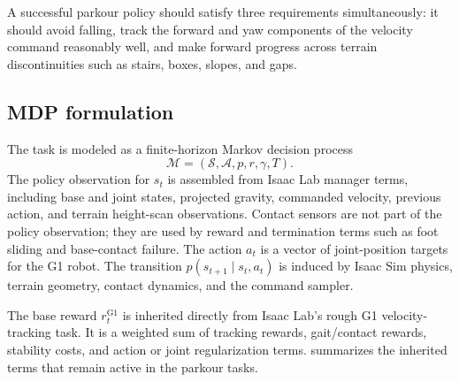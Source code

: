 \documentclass{article}
\begin{document}
A successful parkour policy should satisfy three requirements simultaneously: it should avoid falling, track the forward and yaw components of the velocity command reasonably well, and make forward progress across terrain discontinuities such as stairs, boxes, slopes, and gaps.

\subsection{MDP formulation}

The task is modeled as a finite-horizon Markov decision process
\begin{equation}
    \mathcal{M} = (\mathcal{S}, \mathcal{A}, p, r, \gamma, T).
\end{equation}
The policy observation for $s_t$ is assembled from Isaac Lab manager terms, including base and joint states, projected gravity, commanded velocity, previous action, and terrain height-scan observations. Contact sensors are not part of the policy observation; they are used by reward and termination terms such as foot sliding and base-contact failure. The action $a_t$ is a vector of joint-position targets for the G1 robot. The transition $p(s_{t+1}\mid s_t,a_t)$ is induced by Isaac Sim physics, terrain geometry, contact dynamics, and the command sampler.

The base reward $r_t^{\mathrm{G1}}$ is inherited directly from Isaac Lab's rough G1 velocity-tracking task. It is a weighted sum of tracking rewards, gait/contact rewards, stability costs, and action or joint regularization terms.  summarizes the inherited terms that remain active in the parkour tasks.
\end{document}
